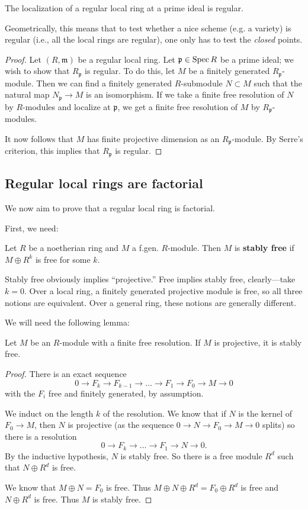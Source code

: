 \begin{theorem} 
The localization of a regular local ring at a prime ideal is regular. 
\end{theorem} 
Geometrically, this means that  to test whether a nice scheme (e.g. a variety) is regular
(i.e., all the local rings are regular), one only has to test the \emph{closed}
points.
\begin{proof} 
Let $(R, \mathfrak{m})$ be a regular local ring. Let $\mathfrak{p} \in \operatorname{Spec} R$
be a prime ideal; we wish to show that $R_{\mathfrak{p}}$ is regular. 
To do this, let $M$ be a finitely generated $R_{\mathfrak{p}}$-module. Then we
can find a finitely generated $R$-submodule $N \subset M$ such that 
the natural map $N_{\mathfrak{p}} \to M$ is an isomorphism.
If we take a finite free resolution of $N$ by $R$-modules and localize at
$\mathfrak{p}$, we get a finite free resolution of $M$ by
$R_{\mathfrak{p}}$-modules. 

It now follows that $M$ has finite projective dimension as an
$R_{\mathfrak{p}}$-module. By Serre's criterion, this implies that
$R_{\mathfrak{p}}$ is regular. 
\end{proof} 

\subsection{Regular local rings are factorial}

We now aim to prove that a regular local ring is factorial.

First, we need:
\begin{definition} 
Let $R$ be a noetherian ring and $M$ a f.gen. $R$-module.  Then $M$ is
\textbf{stably free} if $M \oplus R^k$ is free for some $k$.
\end{definition} 

Stably free obviously implies ``projective.'' 
Free implies stably free, clearly---take $k=0$. Over a local ring, a finitely
generated projective module is free, so all three notions are equivalent. Over a
general ring, these notions are generally different.

We will need the following lemma:

\begin{lemma} 
Let $M$ be an $R$-module with a finite free resolution. If $M$ is projective,
it is stably free.
\end{lemma} 
\begin{proof} 
There is an exact sequence
\[ 0 \to F_k \to F_{k-1} \to \dots \to F_1 \to F_0 \to M \to 0  \]
with the $F_i$ free and finitely generated, by assumption. 

We induct on the length $k$ of the resolution. We know that if $N$ is the
kernel of $F_0 \to M$, then $N$ is projective (as the sequence $0 \to N \to
F_0 \to M \to 0$ splits) so there is a resolution
\[ 0 \to F_k \to \dots \to F_1 \to N \to 0.  \]
By the inductive hypothesis, $N$ is stably free. 
So there is a free module $R^d$ such that $N \oplus R^d$ is free.

We know that $M \oplus N=F_0$ is
free. Thus $M \oplus N \oplus R^d = F_0 \oplus R^d$ is free and $N \oplus R^d$
is free. Thus $M$ is stably free.
\end{proof} 


